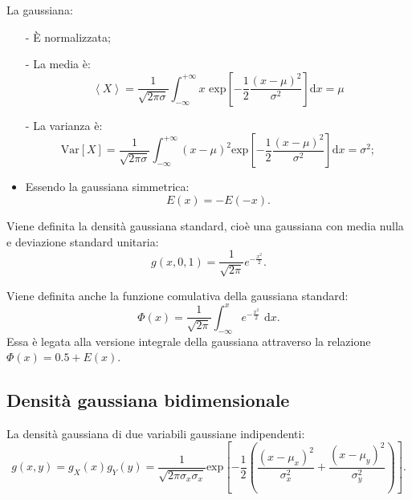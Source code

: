 La gaussiana:
\begin{itemize}
\item[-] \`E normalizzata;
\item[-] La media è:
\begin{equation} 
\left< X \right> =\frac { 1 }{ \sqrt { 2\pi \sigma  }  } \int _{ -\infty  }^{ +\infty  }{ x  { \textrm{ exp} }\left[ -\frac { 1 }{ 2 } \frac { { \left( x-\mu  \right)  }^{ 2 } }{ { \sigma  }^{ 2 } }  \right] \textrm{d}x } =\mu 
\end{equation}
\item[-] La varianza è:
\begin{equation}
\textrm{Var}\left[ X \right] =\frac { 1 }{ \sqrt { 2\pi \sigma  }  } \int _{ -\infty  }^{ +\infty  }{ { \left( x-\mu  \right)  }^{ 2 }{ \textrm{exp} }\left[ -\frac { 1 }{ 2 } \frac { { \left( x-\mu  \right)  }^{ 2 } }{ { \sigma  }^{ 2 } }  \right] \textrm{d}x } ={ \sigma  }^{ 2 } ;
\end{equation}
\item Essendo la gaussiana simmetrica:
\begin{equation}
E(x)=-E(-x).
\end{equation}
\end{itemize}

Viene definita la densità gaussiana standard, cioè una gaussiana con media nulla e deviazione standard unitaria:
\begin{equation}
\label{eq:gaussiana-standard}
g\left( x,0,1 \right) =\frac { 1 }{ \sqrt { 2\pi }  } { e }^{ -\frac { { x }^{ 2 } }{ 2 }  }.
\end{equation}

Viene definita anche la funzione comulativa della gaussiana standard:
\begin{equation}
\label{eq:comulativa-gauss}
\Phi \left( x \right) =\frac { 1 }{ \sqrt { 2\pi }  } \int _{ -\infty  }^{ x }{ e^{ -\frac { { x }^{ 2 } }{ 2 }  }\textrm{ d}x } .
\end{equation}
Essa è legata alla versione integrale della gaussiana attraverso la relazione $\Phi(x)=0.5+E(x)$.

\subsection{Densità gaussiana bidimensionale} %
\label{sec:gaussiana-2D}
La densità gaussiana di due variabili gaussiane indipendenti:
\begin{equation}
\label{eq:gauss:2D}
g\left( x,y \right) ={ g }_{ X }\left( x \right) { g }_{ Y }\left( y \right) =\frac { 1 }{ \sqrt { 2\pi { \sigma  }_{ x }{ \sigma  }_{ x } }  } { \textrm{exp} }\left[ -\frac { 1 }{ 2 } \left( \frac { { \left( x-\mu _{ x } \right)  }^{ 2 } }{ { \sigma  }_{ x }^{ 2 } } +\frac { { \left( x-\mu _{ y } \right)  }^{ 2 } }{ { \sigma  }_{ y }^{ 2 } }  \right)  \right].
\end{equation}

